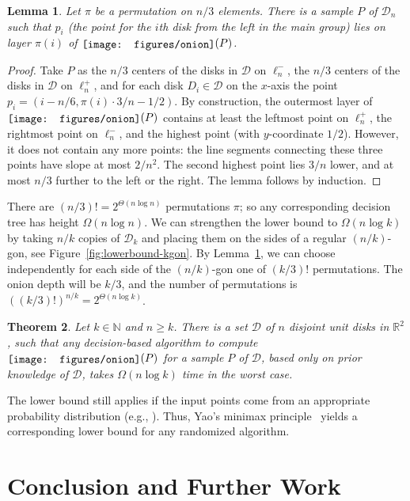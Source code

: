 \documentclass{paper}
\newcommand {\N} {\mathbb {N}}
\newcommand {\R} {\mathbb {R}}
\newcommand {\script} [1] {\ensuremath {\mathcal {#1}}}
\newcommand {\D} {\script {D}}
\newcommand {\onion} {\raisebox{-0.25ex}{\texttt{[image: figures/onion]}}}
\newtheorem{theorem}{Theorem}[section]
\newtheorem{lemma}[theorem]{Lemma}
\begin{document}
\begin{lemma}\label{lem:permute}
Let $\pi$ be a permutation on $n/3$ elements. There is a sample $P$ 
of $\D_n$ such that $p_i$ (the point for the $i$th disk from the left in 
the main group) lies 
on layer $\pi(i)$ of $\onion(P)$.
\end{lemma}
\begin{proof}
Take $P$ as the $n/3$ centers of the disks in $\D$ on $\ell_n^-$,
the $n/3$ centers of the disks in $\D$ on $\ell_n^+$, and for each 
disk $D_i \in \D$ on the $x$-axis
the point $p_i = (i - n/6, \pi(i)\cdot 3/n - 1/2)$.
By construction, the outermost layer of $\onion (P)$ contains at 
least the leftmost point on $\ell_n^+$, the rightmost point on 
$\ell_n^-$, and the highest point (with $y$-coordinate $1/2$).
However, it does not contain any more points: the line segments connecting 
these three points have slope at most $2/n^2$. The second highest point 
lies $3/n$ lower, and at most $n/3$ further to the left or the right.
The lemma follows by induction. 
\end{proof}

There are $(n/3)! = 2^{\Theta(n \log n)}$ permutations $\pi$;
so any corresponding decision tree has height
$\Omega(n \log n)$.
We can strengthen the lower bound to 
$\Omega(n\log k)$ by taking $n/k$ copies of $\D_k$
and placing them on the sides of a regular 
$(n/k)$-gon, see Figure~\ref{fig:lowerbound-kgon}. 
By Lemma~\ref{lem:permute}, we can choose independently for
each side of the $(n/k)$-gon one of $(k/3)!$ permutations.
The onion depth will be $k/3$, and the number of permutations
is $((k/3)!)^{n/k} = 2^{\Theta(n \log k)}$. 


\begin{theorem}\label{thm:lowerb}
  Let $k \in \N$ and $n \geq k$. There is a set
  $\D$ of $n$ disjoint unit disks in $\R^2$,
  such that any decision-based algorithm to compute $\onion (P)$ for a sample
  $P$ of $\D$,
  based only on prior knowledge of $\D$,
  takes $\Omega (n \log k)$ time in the worst case.
\end{theorem}

The lower bound still applies if
the input points come from an appropriate probability distribution (e.g.,
\cite[Claim~2.2]{Ailon11}). Thus, Yao's minimax 
principle~\cite[Chapter~2.2]{MotwaniRa95} 
yields a corresponding lower bound for any randomized algorithm.

\section{Conclusion and Further Work}
\end{document}
